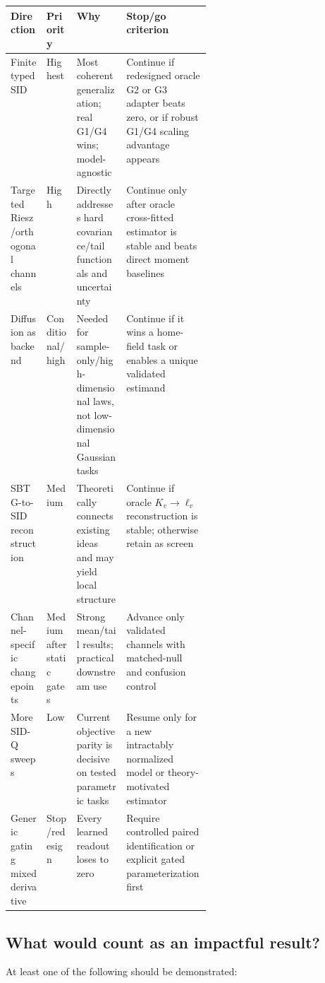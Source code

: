 \documentclass[10pt]{article}
\newcommand{\SIDQ}{\textnormal{\textsc{SID-Q}}\xspace}
\begin{document}
\begin{center}
\begin{tabularx}{\linewidth}{@{}p{0.18\linewidth}p{0.15\linewidth}X X@{}}
\toprule
Direction & Priority & Why & Stop/go criterion \\
\midrule
Finite typed SID & Highest & Most coherent generalization; real G1/G4 wins; model-agnostic & Continue if redesigned oracle G2 or G3 adapter beats zero, or if robust G1/G4 scaling advantage appears \\
Targeted Riesz/orthogonal channels & High & Directly addresses hard covariance/tail functionals and uncertainty & Continue only after oracle cross-fitted estimator is stable and beats direct moment baselines \\
Diffusion as backend & Conditional/high & Needed for sample-only/high-dimensional laws, not low-dimensional Gaussian tasks & Continue if it wins a home-field task or enables a unique validated estimand \\
SBTG-to-SID reconstruction & Medium & Theoretically connects existing ideas and may yield local structure & Continue if oracle \(K_v\to\ell_v\) reconstruction is stable; otherwise retain as screen \\
Channel-specific changepoints & Medium after static gates & Strong mean/tail results; practical downstream use & Advance only validated channels with matched-null and confusion control \\
More \SIDQ sweeps & Low & Current objective parity is decisive on tested parametric tasks & Resume only for a new intractably normalized model or theory-motivated estimator \\
Generic gating mixed derivative & Stop/redesign & Every learned readout loses to zero & Require controlled paired identification or explicit gated parameterization first \\
\bottomrule
\end{tabularx}
\end{center}

\subsection{What would count as an impactful result?}

At least one of the following should be demonstrated:
\end{document}
